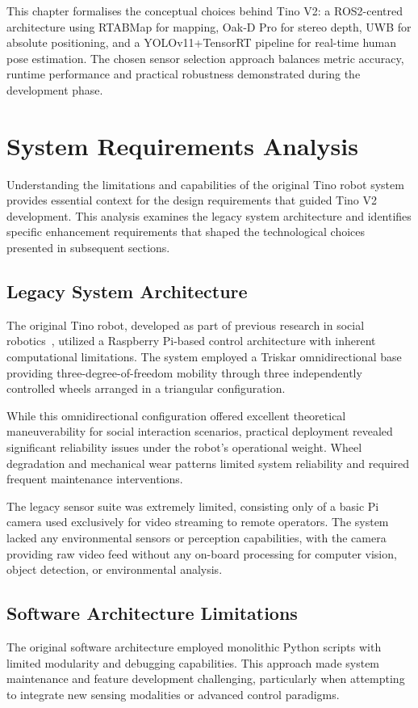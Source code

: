 This chapter formalises the conceptual choices behind Tino V2: a ROS2-centred architecture using RTABMap for mapping, Oak‑D Pro for stereo depth, UWB for absolute positioning, and a YOLOv11+TensorRT pipeline for real-time human pose estimation. The chosen sensor selection approach balances metric accuracy, runtime performance and practical robustness demonstrated during the development phase.

\section{System Requirements Analysis}
Understanding the limitations and capabilities of the original Tino robot system provides essential context for the design requirements that guided Tino V2 development. This analysis examines the legacy system architecture and identifies specific enhancement requirements that shaped the technological choices presented in subsequent sections.

\subsection{Legacy System Architecture}
The original Tino robot, developed as part of previous research in social robotics~\cite{cardillo2024thesis}, utilized a Raspberry Pi-based control architecture with inherent computational limitations. The system employed a Triskar omnidirectional base providing three-degree-of-freedom mobility through three independently controlled wheels arranged in a triangular configuration.

While this omnidirectional configuration offered excellent theoretical maneuverability for social interaction scenarios, practical deployment revealed significant reliability issues under the robot's operational weight. Wheel degradation and mechanical wear patterns limited system reliability and required frequent maintenance interventions.

The legacy sensor suite was extremely limited, consisting only of a basic Pi camera used exclusively for video streaming to remote operators. The system lacked any environmental sensors or perception capabilities, with the camera providing raw video feed without any on-board processing for computer vision, object detection, or environmental analysis.

\subsection{Software Architecture Limitations}
The original software architecture employed monolithic Python scripts with limited modularity and debugging capabilities. This approach made system maintenance and feature development challenging, particularly when attempting to integrate new sensing modalities or advanced control paradigms.

